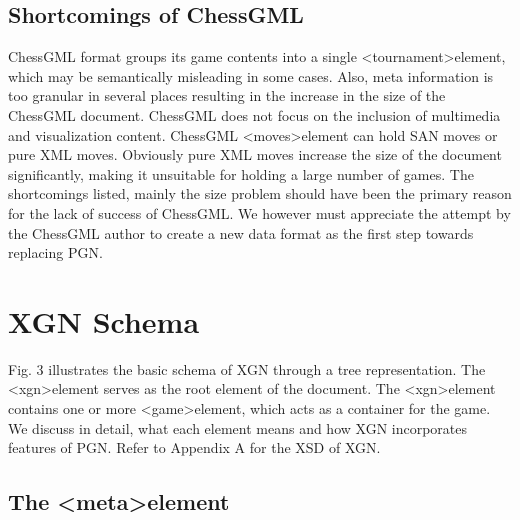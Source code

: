 \documentclass[conference]{IEEEtran}
\begin{document}
\subsection{Shortcomings of ChessGML}

ChessGML format groups its game contents into a single \textless tournament\textgreater  element, which may be semantically misleading in some cases. Also, meta information is too granular in several places resulting in the increase in the size of the ChessGML document. ChessGML does not focus on the inclusion of multimedia and visualization content. ChessGML \textless moves\textgreater  element can hold SAN moves or pure XML moves. Obviously pure XML moves increase the size of the document significantly, making it unsuitable for holding a large number of games. The shortcomings listed, mainly the size problem should have been the primary reason for the lack of success of ChessGML. We however must appreciate the attempt by the ChessGML author to create a new data format as the first step towards replacing PGN.




\section{XGN \textendash  Schema}

Fig. 3 illustrates the basic schema of XGN through a tree representation. The \textless xgn\textgreater  element serves as the root element of the document. The \textless xgn\textgreater  element contains one or more \textless game\textgreater  element, which acts as a container for the game. We discuss in detail, what each element means and how XGN incorporates features of PGN. Refer to Appendix A for the XSD of XGN.




\subsection{The \textless meta\textgreater  element}
\end{document}

